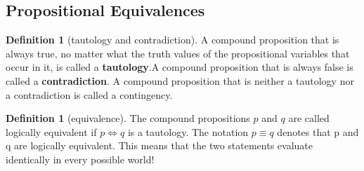 \documentclass[letterpaper,10pt]{article}
\theoremstyle{plain}
\theoremstyle{definition}
\newtheorem{defn}[thm]{Definition}
\theoremstyle{remark}
\begin{document}
\subsection{Propositional Equivalences}

\begin{defn}[tautology and contradiction]

A compound proposition that is always true, no matter what the truth values of the propositional
variables that occur in it, is called a \textbf{tautology}.A compound proposition that is always
false is called a \textbf{contradiction}. A compound proposition that is neither a tautology nor a
contradiction is called a contingency.

\end{defn}
\begin{defn}[equivalence]
The compound propositions $p$ and $q$ are called logically equivalent if $p \iff q$ is a tautology.
The notation $p \equiv q$ denotes that p and q are logically equivalent. This means that the two statements evaluate identically in every possible world!
\end{defn}
\end{document}
